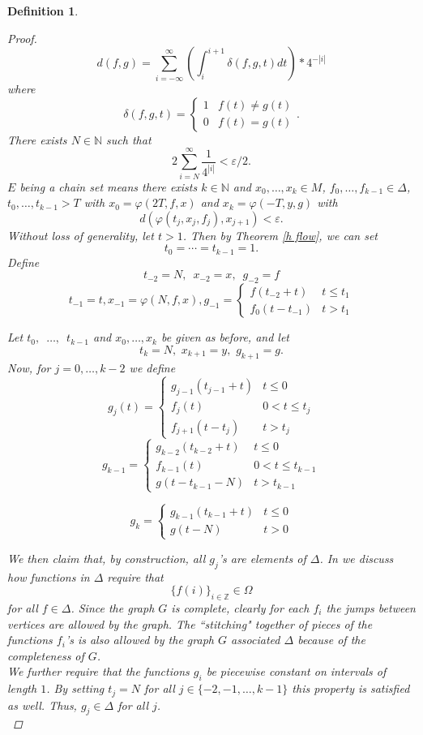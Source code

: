 \documentclass[11pt]{article}
\newtheorem{defn}[thm]{Definition}
\begin{document}
\begin{defn}
\begin{proof}
$$d(f,g)=\displaystyle\sum_{i=-\infty}^{\infty}\left(\displaystyle\int_{i}^{i+1}\delta(f,g,t)dt\right)*4^{-|i|}$$
 where
 $$\delta(f,g,t)=\left\{
     \begin{array}{lr}
       1 &  f(t)\not=g(t)\\
       0 &  f(t)=g(t)
     \end{array}
   \right. .$$
There exists $N\in\mathbb{N}$ such that 
$$2\displaystyle\sum_{i=N}^{\infty}\frac{1}{4^{|i|}}<\varepsilon/2.$$
$E$ being a chain set means there exists $k\in\mathbb{N}$ and $x_0,\ldots,x_k\in M$, $f_0,\ldots,f_{k-1}\in\Delta$, $t_0,\ldots,t_{k-1}>T$ with $x_0=\varphi(2T,f,x)$ and $x_k=\varphi(-T,y,g)$ with 
$$d(\varphi(t_j,x_j,f_j),x_{j+1})<\varepsilon.$$
Without loss of generality, let $t>1$.  Then by Theorem \ref{h flow}, we can set
$$t_0=\cdots=t_{k-1}=1.$$
Define
$$t_{-2}=N, \,\,\,x_{-2}=x, \,\,\,g_{-2}=f$$
$$t_{-1}=t,x_{-1}=\varphi(N,f,x), g_{-1}= \left\{
     \begin{array}{lr}
       f(t_{-2}+t) &  t\leq t_1\\
       f_0(t-t_{-1}) &  t>t_1
     \end{array}
   \right.$$

Let $t_0,\,\,\,\ldots,\,\,\,t_{k-1}$ and $x_0,\ldots,x_k$ be given as before, and let 
$$t_k=N, \,\,x_{k+1}=y,\,\,g_{k+1}=g.$$
Now, for $j=0,\ldots,k-2$ we define
$$g_j(t)=\left\{
     \begin{array}{lr}
      g_{j-1}(t_{j-1}+t) &  t\leq 0\\
       f_j(t) & 0<t\leq t_j\\
       f_{j+1}(t-t_j) & t>t_j
    
     \end{array}
   \right.$$
   $$g_{k-1}=\left\{
     \begin{array}{lr}
       g_{k-2}(t_{k-2}+t) & t\leq0\\
       f_{k-1}(t)&  0<t\leq t_{k-1}\\
       g(t-t_{k-1}-N) & t>t_{k-1}
     \end{array}
   \right.$$
   
   $$g_k=\left\{
     \begin{array}{lr}
       g_{k-1}(t_{k-1}+t) &  t\leq 0\\
       g(t-N) &  t>0
     \end{array}
   \right.$$

We then claim that, by construction, all $g_j$'s are elements of $\Delta$.  In \cite{Ayers2013} we discuss how functions in $\Delta$ require that 
$$\{f(i)\}_{i\in\mathbb{Z}}\in\Omega$$ for all $f\in\Delta$. Since the graph $G$ is complete, clearly for each $f_i$ the jumps between vertices are allowed by the graph.  The ``stitching" together of pieces of the functions $f_i$'s is also allowed by the graph $G$ associated $\Delta$ because of the completeness of $G$. \\
We further require that the functions $g_i$ be piecewise constant on intervals of length $1$.  By setting $t_j=N$ for all $j\in\{-2,-1,\ldots,k-1\}$ this property is satisfied as well.  Thus, $g_j\in\Delta$ for all $j$.
 \\




\end{proof}
\end{defn}
\end{document}
